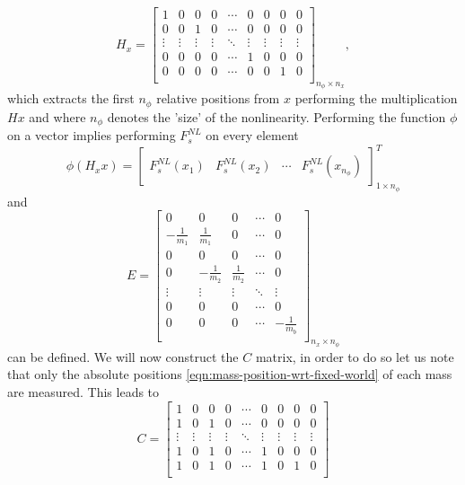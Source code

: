\begin{equation}\label{eqn:Hx}
    H_{x} =
    \begin{bmatrix}
        1 & 0 & 0 & 0 & \cdots & 0 & 0 & 0 & 0 \\
        0 & 0 & 1 & 0 & \cdots & 0 & 0 & 0 & 0 \\
        \vdots & \vdots & \vdots & \vdots & \ddots & \vdots & \vdots & \vdots & \vdots \\
        0 & 0 & 0 & 0 & \cdots & 1 & 0 & 0 & 0 \\
        0 & 0 & 0 & 0 & \cdots & 0 & 0 & 1 & 0 \\
    \end{bmatrix}_{n_{\phi} \times n_{x}},
\end{equation}
which extracts the first $n_{\phi}$ relative positions from $x$ performing the multiplication $Hx$ and where $n_{\phi}$ denotes the 'size' of the nonlinearity. Performing the function $\phi$ on a vector implies performing $F^{NL}_s$ on every element
\begin{equation}
    \phi(H_{x}x) =
    \begin{bmatrix}
        F_s^{NL}(x_1) & F_s^{NL}(x_2) & \cdots & F_s^{NL}(x_{n_{\phi}})
    \end{bmatrix}_{1 \times n_{\phi}}^T
\end{equation}
and
\begin{equation}\label{eqn:msd-E}
    E =
    \begin{bmatrix}
        0 & 0 & 0 & \cdots & 0 \\
        -\frac{1}{m_1} & \frac{1}{m_1} & 0 & \cdots & 0 \\
        0 & 0 & 0 & \cdots & 0 \\
        0 & -\frac{1}{m_2} & \frac{1}{m_2} & \cdots & 0 \\
        \vdots & \vdots & \vdots & \ddots & \vdots \\
        0 & 0 & 0 & \cdots & 0 \\
        0 & 0 & 0 & \cdots & -\frac{1}{m_b} \\
    \end{bmatrix}_{n_x \times n_{\phi}}
\end{equation}
can be defined. We will now construct the $C$ matrix, in order to do so let us note that only the absolute positions \eqref{eqn:mass-position-wrt-fixed-world} of each mass are measured. This leads to
\begin{equation}\label{eqn:msd-C}
    C = 
    \begin{bmatrix}
        1 & 0 & 0 & 0 & \cdots & 0 & 0 & 0 & 0 \\
        1 & 0 & 1 & 0 & \cdots & 0 & 0 & 0 & 0 \\
        \vdots & \vdots & \vdots & \vdots & \ddots & \vdots & \vdots & \vdots & \vdots \\
        1 & 0 & 1 & 0 & \cdots & 1 & 0 & 0 & 0 \\
        1 & 0 & 1 & 0 & \cdots & 1 & 0 & 1 & 0 \\
    \end{bmatrix}
\end{equation}
